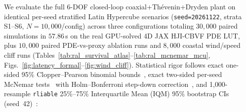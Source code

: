 \documentclass[letterpaper, 10 pt, journal, twoside]{IEEEtran}
\begin{document}
We evaluate the full 6-DOF closed-loop coaxial+Th\'evenin+Dryden plant on identical per-seed stratified Latin Hypercube scenarios (\texttt{seed=20261122}, strata S1--S6, $N=10{,}000$/config) across three configurations totaling $30{,}000$ paired simulations in $57.86$\,s on the real GPU-solved 4D JAX HJI-CBVF PDE LUT, plus $10{,}000$ paired PDE-vs-proxy ablation runs and $8{,}000$ coastal wind/speed cliff runs (Tables~\ref{tab:ral_survival_atlas}--\ref{tab:ral_mcnemar_mcu}, Figs.~\ref{fig:latency_formal}--\ref{fig:wind_cliff}). Statistical rigor follows exact one-sided 95\% Clopper--Pearson binomial bounds~\cite{clopper_pearson_1934}, exact two-sided per-seed McNemar tests~\cite{mcnemar_1947} with Holm--Bonferroni step-down correction~\cite{holm_1979}, and 1{,}000-resample \texttt{rliable} 25\%--75\% Interquartile Mean (IQM) 95\% bootstrap CIs (seed~42)~\cite{agarwal_rliable_2021}:
\end{document}
